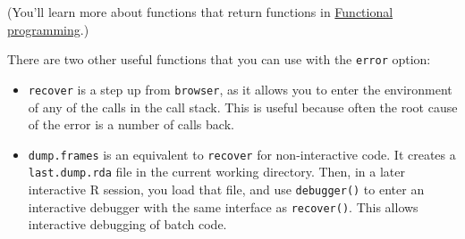 \begin{Shaded}
\begin{Highlighting}[]
\StringTok{ }
  \StringTok{ }\NormalTok{(}\NormalTok{)}
    \NormalTok{(} 
    \NormalTok{()}
  \NormalTok{\}}
\NormalTok{\}}
\NormalTok{(} \NormalTok{())}

\StringTok{ }\NormalTok{(}\NormalTok{)}
\NormalTok{()}
\NormalTok{()}
\end{Highlighting}
\end{Shaded}

(You'll learn more about functions that return functions in
\hyperref[functional-programming]{Functional programming}.)

There are two other useful functions that you can use with the
\texttt{error} option:

\begin{itemize}
\item
  \texttt{recover} is a step up from \texttt{browser}, as it allows you
  to enter the environment of any of the calls in the call stack. This
  is useful because often the root cause of the error is a number of
  calls back. 
\item
  \texttt{dump.frames} is an equivalent to \texttt{recover} for
  non-interactive code. It creates a \texttt{last.dump.rda} file in the
  current working directory. Then, in a later interactive R session, you
  load that file, and use \texttt{debugger()} to enter an interactive
  debugger with the same interface as \texttt{recover()}. This allows
  interactive debugging of batch code. 

\begin{Shaded}
\begin{Highlighting}[]
\StringTok{ }
  \NormalTok{(} \NormalTok{)}
  \NormalTok{(} \NormalTok{)}
\NormalTok{\}}
\NormalTok{(} 

\NormalTok{(}\NormalTok{)}
\NormalTok{()}
\end{Highlighting}
\end{Shaded}
\end{itemize}


